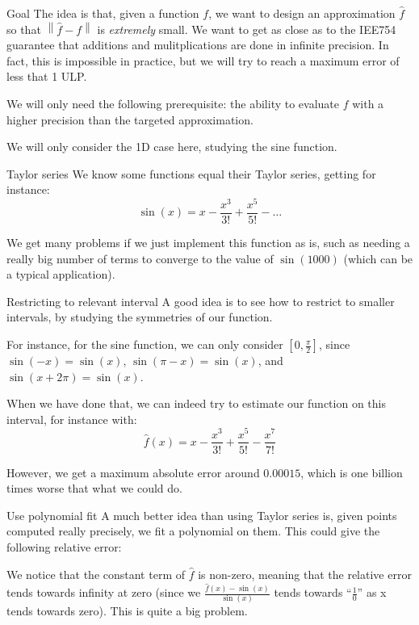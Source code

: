 \documentclass[a4paper]{article}
\begin{document}
\begin{parag}{Goal}
    The idea is that, given a function $f$, we want to design an approximation $\hat{f}$ so that $\left\|\hat{f} - f\right\|$ is \textit{extremely} small. We want to get as close as to the IEE754 guarantee that additions and mulitplications are done in infinite precision. In fact, this is impossible in practice, but we will try to reach a maximum error of less that 1 ULP.

    We will only need the following prerequisite: the ability to evaluate $f$ with a higher precision than the targeted approximation.

    We will only consider the 1D case here, studying the sine function.
\end{parag}

\begin{parag}{Taylor series}
    We know some functions equal their Taylor series, getting for instance: 
    \[\sin\left(x\right) = x - \frac{x^3}{3!} + \frac{x^5}{5!} - \ldots\]
    
    We get many problems if we just implement this function as is, such as needing a really big number of terms to converge to the value of $\sin\left(1000\right)$ (which can be a typical application). 
\end{parag}

\begin{parag}{Restricting to relevant interval}
    A good idea is to see how to restrict to smaller intervals, by studying the symmetries of our function.

    For instance, for the sine function, we can only consider $\left[0, \frac{\pi}{2}\right]$, since $\sin\left(-x\right) = \sin\left(x\right)$, $\sin\left(\pi - x\right) = \sin\left(x\right)$, and $\sin\left(x + 2\pi\right) = \sin\left(x\right)$.

    When we have done that, we can indeed try to estimate our function on this interval, for instance with: 
    \[\hat{f}\left(x\right) = x - \frac{x^3}{3!} + \frac{x^5}{5!} - \frac{x^7}{7!}\]
    
    However, we get a maximum absolute error around $0.00015$, which is one billion times worse that what we could do.
\end{parag}

\begin{parag}{Use polynomial fit}
    A much better idea than using Taylor series is, given points computed really precisely, we fit a polynomial on them. This could give the following relative error:

    We notice that the constant term of $\hat{f}$ is non-zero, meaning that the relative error tends towards infinity at zero (since we $\frac{\hat{f}\left(x\right) - \sin\left(x\right)}{\sin\left(x\right)}$ tends towards ``$\frac{1}{0}$'' as x tends towards zero). This is quite a big problem.
\end{parag}
\end{document}
